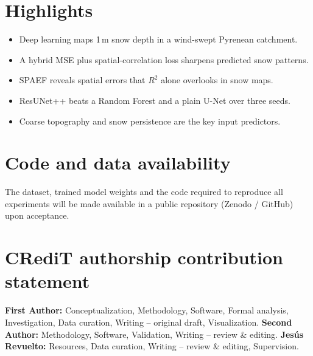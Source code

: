 \documentclass[preprint,12pt]{elsarticle}
\begin{document}
\linenumbers

\section*{Highlights}
\begin{itemize}\setlength{\itemsep}{0pt}
  \item Deep learning maps 1\,m snow depth in a wind-swept Pyrenean catchment.
  \item A hybrid MSE plus spatial-correlation loss sharpens predicted snow patterns.
  \item SPAEF reveals spatial errors that $R^2$ alone overlooks in snow maps.
  \item ResUNet++ beats a Random Forest and a plain U-Net over three seeds.
  \item Coarse topography and snow persistence are the key input predictors.
\end{itemize}









\section*{Code and data availability}
The dataset, trained model weights and the code required to reproduce all
experiments will be made available in a public repository (Zenodo / GitHub)
upon acceptance.

\section*{CRediT authorship contribution statement}
\textbf{First Author:} Conceptualization, Methodology, Software, Formal
analysis, Investigation, Data curation, Writing -- original draft,
Visualization. \textbf{Second Author:} Methodology, Software, Validation,
Writing -- review \& editing. \textbf{Jes\'us Revuelto:} Resources, Data
curation, Writing -- review \& editing, Supervision.
\end{document}
